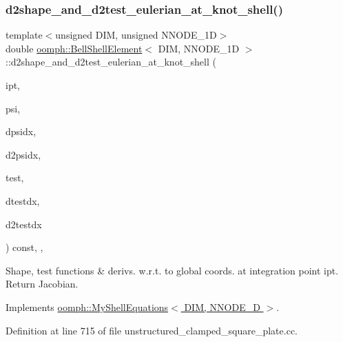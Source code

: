 \subsubsection{\texorpdfstring{d2shape\+\_\+and\+\_\+d2test\+\_\+eulerian\+\_\+at\+\_\+knot\+\_\+shell()}{d2shape\_and\_d2test\_eulerian\_at\_knot\_shell()}}
{\footnotesize\ttfamily template$<$unsigned D\+IM, unsigned N\+N\+O\+D\+E\+\_\+1D$>$ \\
double \hyperlink{classoomph_1_1BellShellElement}{oomph\+::\+Bell\+Shell\+Element}$<$ D\+IM, N\+N\+O\+D\+E\+\_\+1D $>$\+::d2shape\+\_\+and\+\_\+d2test\+\_\+eulerian\+\_\+at\+\_\+knot\+\_\+shell (\begin{DoxyParamCaption}\item[{const unsigned \&}]{ipt,  }\item[{Shape \&}]{psi,  }\item[{D\+Shape \&}]{dpsidx,  }\item[{D\+Shape \&}]{d2psidx,  }\item[{Shape \&}]{test,  }\item[{D\+Shape \&}]{dtestdx,  }\item[{D\+Shape \&}]{d2testdx }\end{DoxyParamCaption}) const\hspace{0.3cm}{\ttfamily [inline]}, {\ttfamily [protected]}, {\ttfamily [virtual]}}



Shape, test functions \& derivs. w.\+r.\+t. to global coords. at integration point ipt. Return Jacobian. 



Implements \hyperlink{classoomph_1_1MyShellEquations_af8f15f0d678c85535bbc3390399dafdd}{oomph\+::\+My\+Shell\+Equations$<$ D\+I\+M, N\+N\+O\+D\+E\+\_\+D $>$}.



Definition at line 715 of file unstructured\+\_\+clamped\+\_\+square\+\_\+plate.\+cc.

\mbox{\label{classoomph_1_1BellShellElement_ace76c40d2ccff50c50140cb27ef9e6f6}} 
